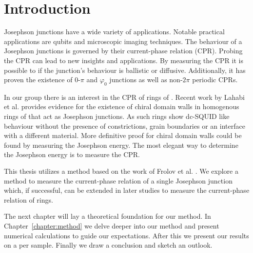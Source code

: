 \chapter{Introduction}
Josephson junctions have a wide variety of applications. Notable practical applications are qubits\cite{placeNewMaterialPlatform2021,pechenezhskiySuperconductingQuasichargeQubit2020} and microscopic imaging techniques\cite{clarkeSQUIDHandbook2004,rogSQUIDontipMagneticMicroscopy2022}. The behaviour of a Josephson junctions is governed by their current-phase relation (CPR). Probing the CPR can lead to new insights and applications. By measuring the CPR it is possible to if the junction's behaviour is ballistic or diffusive\cite{endresCurrentPhaseRelation2023,kayyalhaHighlySkewedCurrent2020}. Additionally, it has proven the existence of $0$-$\pi$ and $\varphi_0$ junctions\cite{frolovMeasurementCurrentPhaseRelation2004,muraniBallisticEdgeStates2017} as well as non-$2\pi$ periodic CPRs\cite{endresCurrentPhaseRelation2023}.

In our group there is an interest in the CPR of rings of . Recent work by Lahabi et al. provides evidence for the existence of chiral domain walls in homogenous rings of \cite{lahabiSpintripletSupercurrentsOdd2018} that act as Josephson junctions. As such  rings show dc-SQUID like behaviour without the presence of constrictions, grain boundaries or an interface with a different material. More definitive proof for chiral domain walls could be found by measuring the Josephson energy\cite{lahabiSpintripletSupercurrentsOdd2018,sigristRoleDomainWalls1999}. The most elegant way to determine the Josephson energy is to measure the CPR.

This thesis utilizes a method based on the work of Frolov et al. \cite{frolovMeasurementCurrentPhaseRelation2004,frolovCurrentphaseRelationsJosephson2005}. We explore a method to measure the current-phase relation of a single Josephson junction which, if successful, can be extended in later studies to measure the current-phase relation of  rings.

The next chapter will lay a theoretical foundation for our method. In Chapter~\ref{chapter:method} we delve deeper into our method and present numerical calculations to guide our expectations. After this we present our results on a per sample. Finally we draw a conclusion and sketch an outlook.